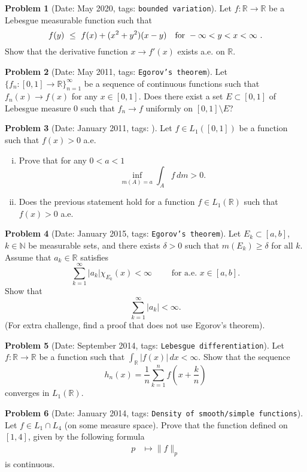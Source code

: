 \documentclass[11pt, notitlepage]{article}
\theoremstyle{definition}
\theoremstyle{definition}
\theoremstyle{definition}
\newtheorem{probstate}{Problem}
\theoremstyle{remark}
\newenvironment{problem}[2]{
    \begin{probstate}[Date: #1, tags: \texttt{#2}]
}
{
  \end{probstate}
}
\newcommand{\R}{\mathbb{R}}
\begin{document}
\begin{problem}{May 2020}{bounded variation}
  Let $f:\mathbb{R}\to\mathbb{R}$ be a Lebesgue measurable function such that
$$
f(y) \ \le \ f(x)+(x^2+y^2)(x-y) \quad {\rm for \ } -\infty<y<x<\infty \ .
$$
Show that the derivative function $x\to f'(x)$ exists a.e. on $\mathbb{R}$.
\end{problem}

\begin{problem}{May 2011}{Egorov's theorem}
  Let $\{f_n: [0,1] \to \R\}_{n=1}^\infty$ be a sequence of continuous functions
     such that $f_n(x) \to f(x)$ for any $x \in [0,1]$. Does there
     exist a set $E \subset [0,1]$ of Lebesgue measure 0 such that
     $f_n \to f$ uniformly on $[0,1] \setminus E$?
\end{problem}

\begin{problem}{January 2011}{}
  Let $f \in L_1([0,1])$ be a function such that $f(x)>0$ a.e.
 \begin{enumerate}[(i)]
 \item Prove that for any $0<a<1$
 \[
   \inf_{m(A)=a} \int_A f \, dm >0.
 \]
 \item Does the previous statement hold for a function $f \in L_1(\mathbb R)$ such that $f(x)>0$ a.e.
 \end{enumerate}
\end{problem}

\begin{problem}{January 2015}{Egorov's theorem}
Let $E_k\subset [a,b]$, $k\in\mathbb N$ be measurable sets, and there exists $\delta>0$ such that $m(E_k)\ge \delta$ for all $k$.
 Assume that $a_k\in\mathbb R$ satisfies
$$\sum_{k=1}^\infty |a_k|\chi_{E_k}(x)<\infty\qquad \text{ for a.e. }  x\in [a,b].$$
Show that
$$\sum_{k=1}^\infty |a_k|<\infty.$$
(For extra challenge, find a proof that does not use Egorov's theorem).
\end{problem}

\begin{problem}{September 2014}{Lebesgue differentiation}
Let  $f: \R \to \R$ be a function such that $\int_{\R} |f(x)| \, dx < \infty$. Show that the sequence
\[
 h_n(x)=\frac{1}{n} \sum_{k=1}^n f \left(x+ \frac{k}{n} \right)
\]
converges in $L_1(\R)$.
\end{problem}

\begin{problem}{January 2014}{Density of smooth/simple functions}
Let $f\in L_1\cap L_4$ (on some measure space).  Prove that the function defined on $[1,4]$, given by the following formula
\begin{align*}
p & \mapsto \|f\|_p
\end{align*}
 is continuous.
\end{problem}
\end{document}
